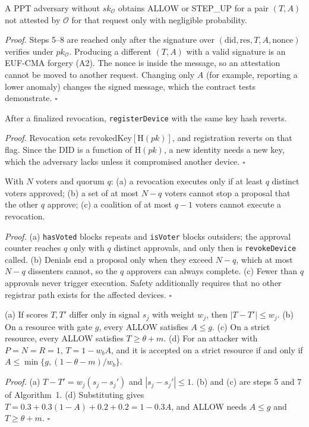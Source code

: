 \begin{proposition}\label{prop:oracle}
A PPT adversary without $sk_\mathcal{O}$ obtains ALLOW or STEP\_UP for a pair $(T,A)$ not attested by $\mathcal{O}$ for that request only with negligible probability.
\end{proposition}
\emph{Proof.} Steps 5--8 are reached only after the signature over $(\mathrm{did},\mathrm{res},T,A,\mathrm{nonce})$ verifies under $pk_\mathcal{O}$. Producing a different $(T,A)$ with a valid signature is an EUF-CMA forgery (A2). The nonce is inside the message, so an attestation cannot be moved to another request. Changing only $A$ (for example, reporting a lower anomaly) changes the signed message, which the contract tests demonstrate. \hfill$\square$

\begin{proposition}\label{prop:key}
After a finalized revocation, \texttt{registerDevice} with the same key hash reverts.
\end{proposition}
\emph{Proof.} Revocation sets $\mathrm{revokedKey}[\mathrm{H}(pk)]$, and registration reverts on that flag. Since the DID is a function of $\mathrm{H}(pk)$, a new identity needs a new key, which the adversary lacks unless it compromised another device. \hfill$\square$

\begin{proposition}\label{prop:gov}
With $N$ voters and quorum $q$: (a) a revocation executes only if at least $q$ distinct voters approved; (b) a set of at most $N-q$ voters cannot stop a proposal that the other $q$ approve; (c) a coalition of at most $q-1$ voters cannot execute a revocation.
\end{proposition}
\emph{Proof.} (a) \texttt{hasVoted} blocks repeats and \texttt{isVoter} blocks outsiders; the approval counter reaches $q$ only with $q$ distinct approvals, and only then is \texttt{revokeDevice} called. (b) Denials end a proposal only when they exceed $N-q$, which at most $N-q$ dissenters cannot, so the $q$ approvers can always complete. (c) Fewer than $q$ approvals never trigger execution. Safety additionally requires that no other registrar path exists for the affected devices. \hfill$\square$

\begin{proposition}\label{prop:bound}
(a) If scores $T,T'$ differ only in signal $s_j$ with weight $w_j$, then $|T-T'|\le w_j$. (b) On a resource with gate $g$, every ALLOW satisfies $A\le g$. (c) On a strict resource, every ALLOW satisfies $T\ge\theta+m$. (d) For an attacker with $P=N=R=1$, $T=1-w_bA$, and it is accepted on a strict resource if and only if $A\le\min\{g,(1-\theta-m)/w_b\}$.
\end{proposition}
\emph{Proof.} (a) $T-T'=w_j(s_j-s_j')$ and $|s_j-s_j'|\le1$. (b) and (c) are steps 5 and 7 of Algorithm~1. (d) Substituting gives $T=0.3+0.3(1-A)+0.2+0.2=1-0.3A$, and ALLOW needs $A\le g$ and $T\ge\theta+m$. \hfill$\square$

